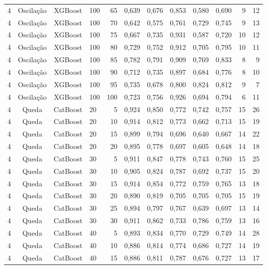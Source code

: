 \begin{longtable}{ccclrrrrrrrr}
4 & Oscilação & XGBoost & 100 & 65 & 0,639 & 0,676 & 0,853 & 0,580 & 0,690 & 9 & 12 \\
4 & Oscilação & XGBoost & 100 & 70 & 0,642 & 0,575 & 0,761 & 0,729 & 0,745 & 9 & 13 \\
4 & Oscilação & XGBoost & 100 & 75 & 0,667 & 0,735 & 0,931 & 0,587 & 0,720 & 10 & 12 \\
4 & Oscilação & XGBoost & 100 & 80 & 0,729 & 0,752 & 0,912 & 0,705 & 0,795 & 10 & 11 \\
4 & Oscilação & XGBoost & 100 & 85 & 0,782 & 0,791 & 0,909 & 0,769 & 0,833 & 8 & 9 \\
4 & Oscilação & XGBoost & 100 & 90 & 0,712 & 0,735 & 0,897 & 0,684 & 0,776 & 8 & 10 \\
4 & Oscilação & XGBoost & 100 & 95 & 0,735 & 0,678 & 0,800 & 0,824 & 0,812 & 9 & 7 \\
4 & Oscilação & XGBoost & 100 & 100 & 0,723 & 0,756 & 0,926 & 0,694 & 0,794 & 6 & 11 \\
4 & Queda & CatBoost & 20 & 5 & 0,924 & 0,850 & 0,772 & 0,742 & 0,757 & 15 & 26 \\
4 & Queda & CatBoost & 20 & 10 & 0,914 & 0,812 & 0,773 & 0,662 & 0,713 & 15 & 19 \\
4 & Queda & CatBoost & 20 & 15 & 0,899 & 0,794 & 0,696 & 0,640 & 0,667 & 14 & 22 \\
4 & Queda & CatBoost & 20 & 20 & 0,895 & 0,778 & 0,697 & 0,605 & 0,648 & 14 & 18 \\
4 & Queda & CatBoost & 30 & 5 & 0,911 & 0,847 & 0,778 & 0,743 & 0,760 & 15 & 25 \\
4 & Queda & CatBoost & 30 & 10 & 0,905 & 0,824 & 0,787 & 0,692 & 0,737 & 15 & 20 \\
4 & Queda & CatBoost & 30 & 15 & 0,914 & 0,854 & 0,772 & 0,759 & 0,765 & 13 & 18 \\
4 & Queda & CatBoost & 30 & 20 & 0,890 & 0,819 & 0,705 & 0,705 & 0,705 & 15 & 19 \\
4 & Queda & CatBoost & 30 & 25 & 0,894 & 0,797 & 0,767 & 0,639 & 0,697 & 13 & 14 \\
4 & Queda & CatBoost & 30 & 30 & 0,911 & 0,862 & 0,733 & 0,786 & 0,759 & 13 & 16 \\
4 & Queda & CatBoost & 40 & 5 & 0,893 & 0,834 & 0,770 & 0,729 & 0,749 & 14 & 28 \\
4 & Queda & CatBoost & 40 & 10 & 0,886 & 0,814 & 0,774 & 0,686 & 0,727 & 14 & 19 \\
4 & Queda & CatBoost & 40 & 15 & 0,886 & 0,811 & 0,787 & 0,676 & 0,727 & 13 & 17 \\

\end{longtable}

